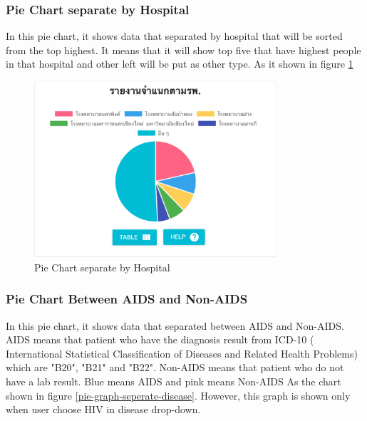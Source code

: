    	\subsubsection{Pie Chart separate by Hospital}
            In this pie chart, it shows data that separated by hospital that will be sorted from the top highest. It means that it will show top five that have highest people in that hospital and other left will be put as other type. As it shown in figure \ref{pie-graph-hospital}
	
    	\FloatBarrier
        	\begin{figure}[h!]
                \centering
            		\includegraphics[width=9cm]{images/chapter-05/pie-graph-hospital.png}
            		\caption{Pie Chart separate by Hospital}
            		\label{pie-graph-hospital}
            \end{figure}
    	\FloatBarrier
    	
    	\subsubsection{Pie Chart Between AIDS and Non-AIDS}
            In this pie chart, it shows data that separated between AIDS and Non-AIDS. AIDS means that patient who have the diagnosis result from ICD-10 ( International Statistical Classification of Diseases and Related Health Problems) which are "B20", "B21" and "B22". Non-AIDS means that patient who do not have a lab result. Blue means AIDS and pink means Non-AIDS As the chart shown in figure \ref{pie-graph-seperate-disease}. However, this graph is shown only when user choose HIV in disease drop-down.

